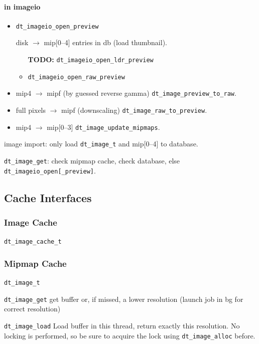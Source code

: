 \documentclass[a4paper,twoside]{scrartcl}
\newcommand{\todo}[1]{{\color{red}\bf TODO: #1}}
\newcommand{\code}[1]{\texttt{\color{codecol}#1}}
\begin{document}
\paragraph{in imageio}
\begin{itemize}
  \item \code{dt\_imageio\_open\_preview}

    disk $\rightarrow$ mip[0--4] entries in db (load thumbnail).
    \begin{itemize}
      \item[\todo{}]  \code{dt\_imageio\_open\_ldr\_preview}
      \item \code{dt\_imageio\_open\_raw\_preview}
    \end{itemize}
  \item mip4 $\rightarrow$ mipf (by guessed reverse gamma) \code{dt\_image\_preview\_to\_raw}.
  \item full pixels $\rightarrow$ mipf (downscaling) \code{dt\_image\_raw\_to\_preview}.
  \item mip4 $\rightarrow$ mip[0--3] \code{dt\_image\_update\_mipmaps}.
\end{itemize}

image import: only load \code{dt\_image\_t} and mip[0--4] to database.

\code{dt\_image\_get}: check mipmap cache, check database, else \code{dt\_imageio\_open[\_preview]}.

\newpage
\subsection{Cache Interfaces}

\subsubsection{Image Cache}

\code{dt\_image\_cache\_t}

\subsubsection{Mipmap Cache}

\code{dt\_image\_t}

\begin{description}
  \item{\code{dt\_image\_get}} get buffer or, if missed, a lower resolution (launch job in bg for correct resolution)
  \item{\code{dt\_image\_load}} Load buffer in this thread, return exactly this resolution.
    No locking is performed, so be sure to acquire the lock using \code{dt\_image\_alloc} before.
\end{description}
\end{document}
